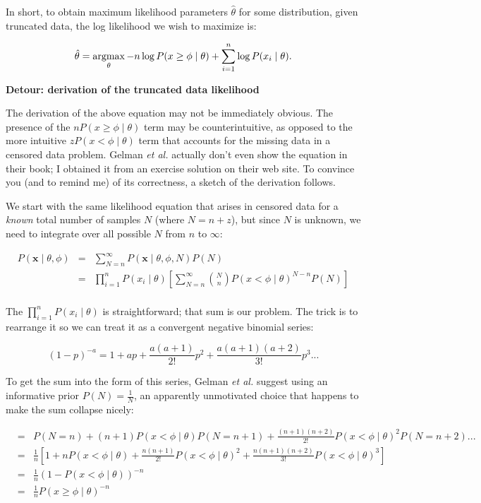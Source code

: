 In short, to obtain maximum likelihood parameters $\hat{\theta}$ for
some distribution, given truncated data, the log likelihood we wish to
maximize is:

\begin{equation}
  \hat{\theta} = \mathop{\mathrm{argmax}}\limits_\theta -n \log P(x \geq \phi \mid \theta) 
                   + \sum_{i=1}^n \log P(x_i \mid \theta).
\label{eqn:truncated_objective}
\end{equation}

\textbf{Detour: derivation of the truncated data likelihood}

The derivation of the above equation may not be immediately obvious.
The presence of the $n P(x \geq \phi \mid \theta)$ term may be
counterintuitive, as opposed to the more intuitive $z P(x < \phi \mid
\theta)$ term that accounts for the missing data in a censored data
problem. Gelman \emph{et al.} actually don't even show the equation in
their book; I obtained it from an exercise solution on their web site.
To convince you (and to remind me) of its correctness, a sketch of the
derivation follows.

We start with the same likelihood equation that arises in censored
data for a \emph{known} total number of samples $N$ (where $N=n+z$),
but since $N$ is unknown, we need to integrate over all possible $N$
from $n$ to $\infty$:

\begin{eqnarray*}
   P(\mathbf{x} \mid \theta, \phi) & = &
    \sum_{N=n}^{\infty}   P(\mathbf{x} \mid \theta, \phi, N) P(N)\\
   & = & 
    \prod_{i=1}^n P(x_i \mid \theta) 
    \left[
      \sum_{N=n}^\infty {N \choose n} P(x < \phi \mid \theta)^{N-n} P(N)
    \right]\\
\end{eqnarray*}

The $\prod_{i=1}^n P(x_i \mid \theta)$ is straightforward; that sum is
our problem. The trick is to rearrange it so we can treat it as a
convergent negative binomial series:

\[
   (1-p)^{-a} = 1 + ap + \frac{a(a+1)}{2!} p^2 +
   \frac{a(a+1)(a+2)}{3!} p^3...
\]

To get the sum into the form of this series, Gelman \emph{et al.}
suggest using an informative prior $P(N) = \frac{1}{N}$, an apparently
unmotivated choice that happens to make the sum collapse nicely:

\begin{eqnarray*}
 &=& P(N=n) 
    + (n+1) P(x < \phi \mid \theta) P(N=n+1) 
    + \frac{(n+1)(n+2)}{2!} P(x < \phi \mid \theta)^2 P(N=n+2) ...\\
 &= & \frac{1}{n} \left[
      1 
      + n P(x < \phi \mid \theta)
      + \frac{n(n+1)}{2!} P(x < \phi \mid \theta)^2 
      + \frac{n(n+1)(n+2)}{3!} P(x < \phi \mid \theta)^3 \right]\\
 &=& \frac{1}{n} (1 - P(x < \phi \mid \theta))^{-n}\\
 &=& \frac{1}{n} P(x \geq \phi \mid \theta)^{-n}\\
\end{eqnarray*}


